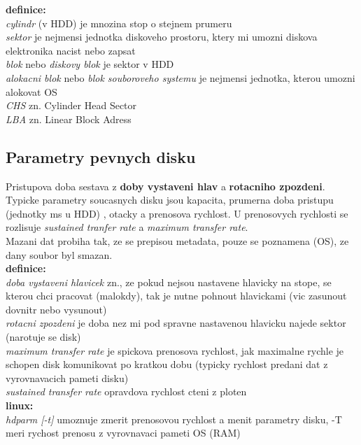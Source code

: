 \documentclass[a4paper, 11pt]{article}
\begin{document}
\noindent\textbf{definice:} \\[0.5em]
\textit{cylindr} (v HDD) je mnozina stop o stejnem prumeru \\[0.2em]
\textit{sektor} je nejmensi jednotka diskoveho prostoru, ktery mi umozni diskova elektronika nacist nebo zapsat \\[0.2em]
\textit{blok} nebo \textit{diskovy blok} je sektor v HDD \\[0.2em]
\textit{alokacni blok} nebo \textit{blok souboroveho systemu} je nejmensi jednotka, kterou umozni alokovat OS \\[0.2em]
\textit{CHS} zn. Cylinder Head Sector  \\[0.2em]
\textit{LBA} zn. Linear Block Adress \\[0.2em]

\subsection{Parametry pevnych disku}
Pristupova doba sestava z \textbf{doby vystaveni hlav} a \textbf{rotacniho zpozdeni}. \\

\noindent Typicke parametry soucasnych disku jsou kapacita, prumerna doba pristupu (jednotky ms u HDD) , otacky a prenosova rychlost. U prenosovych rychlosti se rozlisuje \textit{sustained tranfer rate} a \textit{maximum transfer rate}. \\

\noindent Mazani dat probiha tak, ze se prepisou metadata, pouze se poznamena (OS), ze dany soubor byl smazan. \\

\noindent\textbf{definice:} \\[0.5em]
\textit{doba vystaveni hlavicek} zn., ze pokud nejsou nastavene hlavicky na stope, se kterou chci pracovat (malokdy), tak je nutne pohnout hlavickami (vic zasunout dovnitr nebo vysunout) \\[0.2em]
\textit{rotacni zpozdeni} je doba nez mi pod spravne nastavenou hlavicku najede sektor (narotuje se disk) \\[0.2em]
\textit{maximum transfer rate} je spickova prenosova rychlost, jak maximalne rychle je schopen disk komunikovat po kratkou dobu (typicky rychlost predani dat z vyrovnavacich pameti disku) \\[0.2em]
\textit{sustained transfer rate} opravdova rychlost cteni z ploten \\[0.2em]

\noindent \textbf{linux:} \\[0.5em]
\textit{hdparm [-t]} umoznuje zmerit prenosovou rychlost a menit parametry disku, -T meri rychost prenosu z vyrovnavaci pameti OS (RAM)
\end{document}
